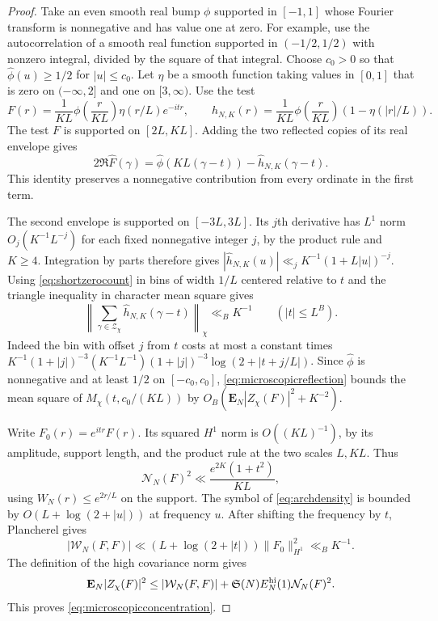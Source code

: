 \documentclass[11pt,a4paper]{article}
\numberwithin{equation}{section}
\newcommand{\SSS}{\mathfrak S}
\newcommand{\NN}{\mathcal N_N}
\begin{document}
\begin{proof}
Take an even smooth real bump $\phi$ supported in $[-1,1]$
whose Fourier transform is nonnegative and has value one
at zero. For example, use the autocorrelation of a smooth
real function supported in $(-1/2,1/2)$ with nonzero
integral, divided by the square of that integral.
Choose $c_0>0$ so that $\widehat\phi(u)\ge1/2$ for
$|u|\le c_0$. Let $\eta$ be a smooth function taking
values in $[0,1]$ that is zero on $(-\infty,2]$ and one
on $[3,\infty)$. Use the test
\[
 F(r)=\frac1{KL}\phi\!\left(\frac r{KL}\right)\eta(r/L)e^{-itr},
 \qquad
 h_{N,K}(r)=\frac1{KL}\phi\!\left(\frac r{KL}\right)
                                  (1-\eta(|r|/L)).
\]
The test $F$ is supported on $[2L,KL]$.
Adding the two reflected copies of its real envelope gives
\begin{equation}
 2\Re\widehat F(\gamma)
     =\widehat\phi(KL(\gamma-t))-\widehat h_{N,K}(\gamma-t).
 \label{eq:microscopicreflection}
\end{equation}
This identity preserves a nonnegative contribution
from every ordinate in the first term.

The second envelope is supported on $[-3L,3L]$.
Its $j$th derivative has $L^1$ norm $O_j(K^{-1}L^{-j})$
for each fixed nonnegative integer $j$, by the product
rule and $K\ge4$. Integration by parts therefore gives
$|\widehat h_{N,K}(u)|\ll_j K^{-1}(1+L|u|)^{-j}$.
Using \cref{eq:shortzerocount} in bins of width $1/L$
centered relative to $t$ and the triangle inequality in
character mean square gives
\[
 \left\|\sum_{\gamma\in\mathcal Z_\chi}
                 \widehat h_{N,K}(\gamma-t)\right\|_\chi
           \ll_B K^{-1}
           \qquad (|t|\le L^B).
\]
Indeed the bin with offset $j$ from $t$ costs at most a
constant times $K^{-1}(1+|j|)^{-3}
(K^{-1}L^{-1})(1+|j|)^{-3}\log(2+|t+j/L|)$.
Since $\widehat\phi$ is nonnegative and at least $1/2$ on
$[-c_0,c_0]$, \cref{eq:microscopicreflection} bounds the
mean square of $M_\chi(t,c_0/(KL))$ by
$O_B(\mathbf E_N|Z_\chi(F)|^2+K^{-2})$.

Write $F_0(r)=e^{itr}F(r)$. Its squared $H^1$ norm is
$O((KL)^{-1})$, by its amplitude, support length, and
the product rule at the two scales $L,KL$. Thus
\[
 \NN(F)^2\ll \frac{e^{2K}(1+t^2)}{KL},
\]
using $W_N(r)\le e^{2r/L}$ on the support.
The symbol of \cref{eq:archdensity} is bounded by
$O(L+\log(2+|u|))$ at frequency $u$.
After shifting the frequency by $t$, Plancherel gives
\[
 |\mathcal W_N(F,F)|
   \ll (L+\log(2+|t|))\|F_0\|_{H^1}^2
   \ll_B K^{-1}.
\]
The definition of the high covariance norm gives
\[
 \mathbf E_N|Z_\chi(F)|^2\le|\mathcal W_N(F,F)|
       +\SSS(N) E_N^{\rm hi}(1)\NN(F)^2.
\]
This proves \cref{eq:microscopicconcentration}.


\end{proof}
\end{document}
